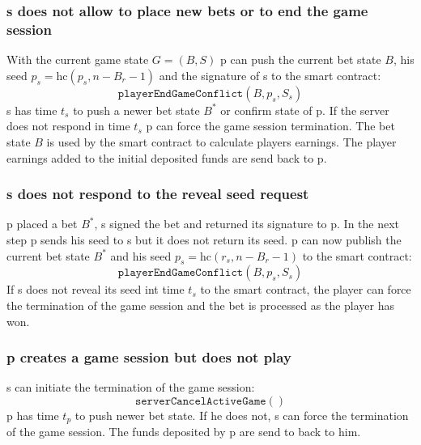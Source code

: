 \documentclass[oneside]{amsart}
\begin{document}
\begin{multicols}{2}
\subsubsection{\Gls{s} does not allow to place new bets or to end the game session}
With the current game state $G = (B,S)$ \Gls{p} can push the current bet state $B$, his seed
$p_s=\text{hc}(p_s, n - B_r - 1)$ and the signature of \gls{s} to the smart contract:
\begin{equation}
    \texttt{playerEndGameConflict}(B, p_s, S_s)
\end{equation}
\Gls{s} has time $t_s$ to push a newer bet state $B^*$ or confirm state of \gls{p}.
If the server does not respond in time $t_s$ \gls{p} can force the game session termination.
The bet state $B$ is used by the smart contract to calculate players earnings.
The player earnings added to the initial deposited funds are send back to \gls{p}. %

\subsubsection{\Gls{s} does not respond to the reveal seed request}\label{subsubsec:serverNotRevealingSeed}
\Gls{p} placed a bet $B^*$, \gls{s} signed the bet and returned its signature to \gls{p}.
In the next step \gls{p} sends his seed to \gls{s} but it does not return its seed.
\Gls{p} can now publish the current bet state $B^*$ and his seed
$p_s=\text{hc}(r_s, n - B_r - 1)$ to the smart contract:
\begin{equation}
    \texttt{playerEndGameConflict}(B, p_s, S_s)
\end{equation}
If \gls{s} does not reveal its seed int time $t_s$ to the smart contract, the player can
force the termination of the game session and the bet is processed as the player has won.


\subsubsection{\Gls{p} creates a game session but does not play}\label{subsubsec:playerStopsPlaying}
\Gls{s} can initiate the termination of the game session:
\begin{equation}
    \texttt{serverCancelActiveGame}()
\end{equation}
\Gls{p} has time $t_p$ to push newer bet state.
If he does not, \gls{s} can force the termination of the game session.
The funds deposited by \gls{p} are send to back to him.


\end{multicols}
\end{document}
